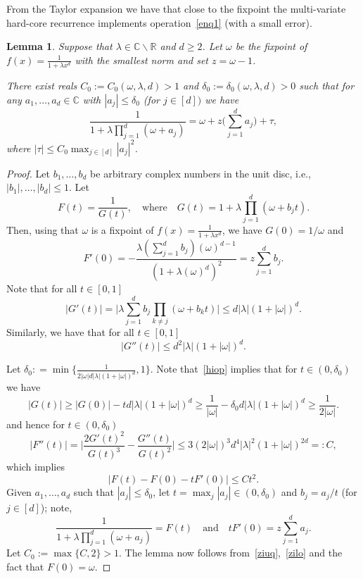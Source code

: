 \documentclass[11pt]{article}
\newtheorem{lemma}[theorem]{Lemma}
\def\Reals{\mathbb{R}}
\def\Complex{\mathbb{C}}
\begin{document}
From the Taylor expansion we have that close to the fixpoint the multi-variate hard-core
recurrence implements operation~\eqref{enq1} (with a small error).

\begin{lemma}\label{apx} 
Suppose that  $\lambda\in \Complex\backslash\Reals$ and $d\geq 2$. 
Let $\omega$ be the fixpoint of $f(x)=\frac{1}{1+\lambda x^{d}}$ with the smallest norm and set $z=\omega-1$.

There exist reals $C_0:=C_0(\omega,\lambda,d)>1$ and
$\delta_0:=\delta_0(\omega,\lambda,d)>0$ such that for
any $a_1,\dots,a_d\in\Complex$ with $|a_j|\leq\delta_0$ (for $j\in [d])$ we have
\begin{equation}
\frac{1}{1+\lambda \prod_{j=1}^d (\omega + a_j) } = \omega + z \bigg(\sum_{j=1}^d a_j\bigg) + \tau,
\end{equation}
where $|\tau|\leq C_0 \max_{j\in [d]} |a_j|^2$.
\end{lemma}
\begin{proof}
Let $b_1,\hdots,b_d$ be arbitrary complex numbers in the unit disc, i.e., $|b_1|,\hdots,|b_d|\leq 1$. Let
\[F(t) = \frac{1}{G(t)},\quad\mbox{where}\quad G(t)=1+\lambda \prod_{j=1}^d (\omega + b_j t).\]
Then, using that $\omega$ is a fixpoint of $f(x)=\frac{1}{1+\lambda x^{d}}$, we have $G(0)=1/\omega$ and
\begin{equation}\label{zilo}
F'(0) = - \frac{\lambda \left(\sum_{j=1}^d b_j\right) (\omega)^{d-1}}{\left(1+\lambda (\omega)^d\right)^2} = z \sum_{j=1}^d b_j.
\end{equation}
Note that for all $t\in [0,1]$
\begin{equation}\label{hiop}
|G'(t)| = \Big|\lambda\sum_{j=1}^d b_j \prod_{k\neq j} (\omega + b_k t)\Big|\leq d |\lambda| (1+|\omega|)^d.
\end{equation}
Similarly, we have that for all $t\in [0,1]$
\begin{equation*}
|G''(t)| \leq d^2 |\lambda| (1+|\omega|)^d.
\end{equation*}

Let $\delta_0: = \min\big\{\frac{1}{2 |\omega| d |\lambda| (1+|\omega|)^{d}},1\big\}$. Note that~\eqref{hiop} implies that for $t\in (0,\delta_0)$ we have
\[|G(t)| \geq |G(0)| - t d |\lambda| (1+|\omega|)^d \geq \frac{1}{|\omega|} - \delta_0  d |\lambda| (1+|\omega|)^d \geq \frac{1}{2|\omega|}.\]
and hence for $t\in (0, \delta_0)$
\begin{equation}\label{zzzzz1}
|F''(t)| = \Bigg| \frac{2G'(t)^2}{G(t)^3} - \frac{G''(t)}{G(t)^2}\Bigg| \leq 3 (2|\omega|)^3 d^4 |\lambda|^2 (1+|\omega|)^{2d} =: C,
\end{equation}
which implies
\begin{equation}\label{ziuq}
|F(t) - F(0) - t F'(0)| \leq Ct^2.
\end{equation}
Given $a_1,\dots,a_d$ such that $|a_j|\leq\delta_0$, let $t=\max_j |a_j|\in(0,\delta_0)$ and $b_j=a_j/t$ (for $j\in [d]$); note,
$$
\frac{1}{1+\lambda \prod_{j=1}^d (\omega + a_j) } = F(t) \quad\mbox{and}\quad t F'(0) = z \sum_{j=1}^d a_j.
$$
Let $C_0:=\max\{C,2\}>1$. The lemma now follows  from~\eqref{ziuq},~\eqref{zilo} and the fact that $F(0)=\omega$.
\end{proof}
\end{document}
